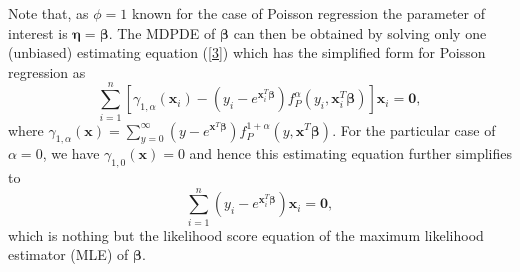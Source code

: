 \documentclass[a4paper]{article}%
\begin{document}
Note that, as $\phi=1$ known for the case of Poisson regression the parameter
of interest is $\boldsymbol{\eta}=\boldsymbol{\beta}$. The MDPDE of
$\boldsymbol{\beta}$ can then be obtained by solving only one (unbiased)
estimating equation (\ref{3}) which has the simplified form for Poisson
regression as
\begin{equation}
\sum_{i=1}^{n} \left[  \gamma_{1,\alpha}(\boldsymbol{x}_{i}) -\left(  y_{i}-
e^{\boldsymbol{x}_{i}^{T}\boldsymbol{\beta}}\right)  f_{P}^{\alpha}%
(y_{i},\boldsymbol{x}_{i}^{T}\boldsymbol{\beta})\right]  \boldsymbol{x}_{i}
=\boldsymbol{0}, \label{EQ:est_eqn_PoissReg}%
\end{equation}
where $\gamma_{1,\alpha}(\boldsymbol{x}) = \displaystyle\sum_{y=0}^{\infty} (y
- e^{\boldsymbol{x}^{T}\boldsymbol{\beta}}) f_{P}^{1+\alpha}(y,\boldsymbol{x}%
^{T}\boldsymbol{\beta}).$ For the particular case of $\alpha=0$, we have
$\gamma_{1,0}(\boldsymbol{x}) =0$ and hence this estimating equation further
simplifies to
\begin{equation}
\sum_{i=1}^{n} \left(  y_{i}- e^{\boldsymbol{x}_{i}^{T}\boldsymbol{\beta}%
}\right)  \boldsymbol{x}_{i} = \boldsymbol{0},
\end{equation}
which is nothing but the likelihood score equation of the  maximum likelihood estimator (MLE)
of $\boldsymbol{\beta}$.
\end{document}
